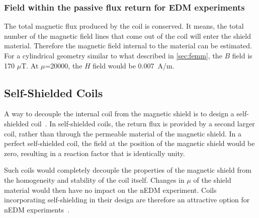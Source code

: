 \documentclass[review]{elsarticle}
\begin{document}
\subsubsection{Field within the passive flux return for EDM experiments}
The total magnetic flux produced by the coil is conserved. It means, the total number of the magnetic field lines that come out of the coil will enter the shield material. Therefore the magnetic field internal to the material can be estimated. For a cylindrical geometry similar to what described in \ref{sec:femm}, the $B$ field is 170 $\mu$T. At $\mu$=20000, the $H$ field would be 0.007~A/m.




\subsection{Self-Shielded Coils}

A way to decouple the internal coil from the magnetic shield is to
design a self-shielded
coil~\cite{bib:cpviolwithoutstrangeness,bib:someotherselfshieldedcoilpapers}.
In self-shielded coils, the return flux is provided by a second larger
coil, rather than through the permeable material of the magnetic
shield.  In a perfect self-shielded coil, the field at the position of
the magnetic shield would be zero, resulting in a reaction factor that
is identically unity.

Such coils would completely decouple the properties of the magnetic
shield from the homogeneity and stability of the coil itself.  Changes
in $\mu$ of the shield material would then have no impact on the nEDM
experiment.  Coils incorporating self-shielding in their design are
therefore an attractive option for nEDM
experiments~\cite{bib:cpviolwithoutstrangeness}.


\end{document}
